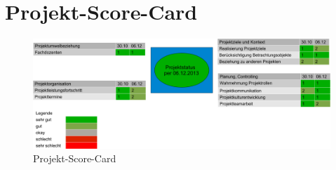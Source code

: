 \section{Projekt-Score-Card}
\begin{figure}[!ht]
\includegraphics[width=\textwidth, height=\textheight, keepaspectratio, angle=0]{images/projekt-score-card}
\caption{Projekt-Score-Card}
\end{figure}